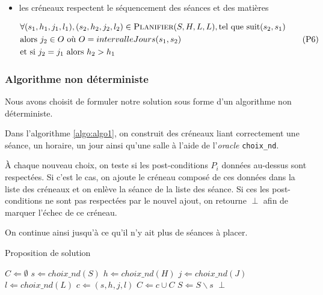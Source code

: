 \begin{itemize}
    \item les créneaux respectent le séquencement des séances et des matières

        \begin{equation}\label{eqn:p6}
            \begin{split}
                & \forall(s_1, h_1, j_1, l_1), (s_2, h_2, j_2, l_2)
                \in \textsc{Planifier}(S, H, L, L),
                \text{tel que} \  \text{suit}(s_2, s_1)\\
                & \text{alors} \  j_2 \in O
                \  \text{où} \  O = intervalleJours(s_1, s_2)\\
                & \text{et si} \  j_2 = j_1 \  \text{alors} \  h_2 > h_1
            \end{split}
            \tag{P6}
        \end{equation}

\end{itemize}


\subsubsection{Algorithme non déterministe}

Nous avons choisit de formuler notre solution sous forme d'un algorithme non
déterministe.

Dans l'algorithme \ref{algo:algo1}, on construit des créneaux liant correctement
une séance, un horaire, un jour ainsi qu'une salle à l'aide de l'\emph{oracle}
\texttt{choix\_nd}.

À chaque nouveau choix, on teste si les post-conditions $P_i$ données au-dessus
sont respectées.
Si c'est le cas, on ajoute le créneau composé de ces données
dans la liste des créneaux et on enlève la séance de la liste des séance.
Si ces les post-conditions ne sont pas respectées par le nouvel ajout, on
retourne $\perp$ afin de marquer l'échec de ce créneau.

On continue ainsi jusqu'à ce qu'il n'y ait plus de séances à placer.

\begin{algorithm}
\caption{Proposition de solution}
\label{algo:algo1}
\begin{algorithmic}
    \STATE $C \Leftarrow \emptyset$
        \STATE $s \Leftarrow choix\_nd(S)$
        \STATE $h \Leftarrow choix\_nd(H)$
        \STATE $j \Leftarrow choix\_nd(J)$
        \STATE $l \Leftarrow choix\_nd(L)$
        \STATE $c \Leftarrow (s, h, j, l)$
            \STATE $C \Leftarrow c \cup C$
            \STATE $S \Leftarrow S \backslash s$
        \ELSE
            \RETURN $\perp$
        \ENDIF
    \ENDWHILE
\end{algorithmic}
\end{algorithm}

